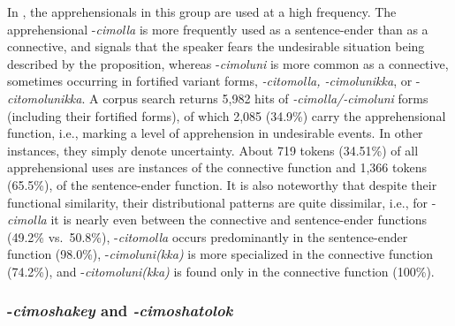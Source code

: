 \documentclass[output=paper,colorlinks,citecolor=brown]{langscibook}
\begin{document}
In , the apprehensionals in this group are used at a high frequency. The apprehensional \nobreakdash-\textit{cimolla} is more frequently used as a sentence-ender than as a connective, and signals that the speaker fears the undesirable situation being described by the proposition, whereas \nobreakdash-\textit{cimoluni} is more common as a connective, sometimes occurring in fortified variant forms, \textit{-citomolla, -cimolunikka}, or \nobreakdash-\textit{citomolunikka}. A corpus search returns 5,982 hits of \textit{-cimolla/-cimoluni} forms (including their fortified forms), of which 2,085 (34.9\%) carry the apprehensional function, i.e., marking a level of apprehension in undesirable events. In other instances, they simply denote uncertainty. About 719 tokens (34.51\%) of all apprehensional uses are instances of the connective function and 1,366 tokens (65.5\%), of the sentence-ender function. It is also noteworthy that despite their functional similarity, their distributional patterns are quite dissimilar, i.e., for \nobreakdash-\textit{cimolla} it is nearly even between the connective and sentence-ender functions (49.2\% vs.\ 50.8\%), \nobreakdash-\textit{citomolla} occurs predominantly in the sentence-ender function (98.0\%), \nobreakdash-\textit{cimoluni(kka)} is more specialized in the connective function (74.2\%), and \nobreakdash-\textit{citomoluni(kka)} is found only in the connective function (100\%).



\subsubsection{-\textit{cimoshakey} and \textit{-cimoshatolok}} 
\end{document}
